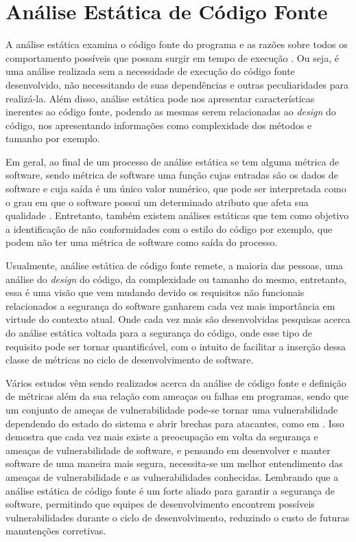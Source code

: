 \chapter{Análise Estática de Código Fonte} \label{chap:analiseestatica}

A análise estática examina o código fonte do programa e as razões sobre todos os
comportamento possíveis que possam surgir em tempo de execução
\cite{ernst:2005}. Ou seja, é uma análise realizada sem a necessidade de
execução do código fonte desenvolvido, não necessitando de suas dependências e
outras peculiaridades para realizá-la. Além disso, análise estática pode nos apresentar
características inerentes ao código fonte, podendo as mesmas serem relacionadas
ao \textit{design} do código, nos apresentando informações como complexidade dos
métodos e tamanho por exemplo.

Em geral, ao final de um processo de análise estática se tem alguma métrica de
software, sendo métrica de software uma função cujas entradas são os dados de
software e cuja saída é um único valor numérico, que pode ser interpretada como
o grau em que o software possui um determinado atributo que afeta sua qualidade
\cite{ieee:1061}. Entretanto, também existem análises estáticas que tem como
objetivo a identificação de não conformidades com o estilo do código por exemplo,
que podem não ter uma métrica de software como saída do processo.

Usualmente, análise estática de código fonte remete, a maioria das pessoas, uma
análise do \textit{design} do código, da complexidade ou tamanho do mesmo,
entretanto, essa é uma visão que vem mudando devido os requisitos não funcionais
relacionados a segurança do software ganharem cada vez mais importância em
virtude do contexto atual. Onde cada vez mais são desenvolvidas pesquisas acerca
do análise estática voltada para a segurança do código, onde esse tipo de
requisito pode ser tornar quantificável, com o intuito de facilitar a inserção
dessa classe de métricas no ciclo de desenvolvimento de software.

Vários estudos vêm sendo realizados acerca da análise de código fonte e
definição de métricas além da sua relação com ameaças ou falhas em programas,
sendo que um conjunto de ameças de vulnerabilidade pode-se tornar uma
vulnerabilidade dependendo do estado do sistema e abrir brechas para atacantes,
como em .
Isso demostra que cada vez mais existe a preocupação em volta da segurança e
ameaças de vulnerabilidade de software, e pensando em desenvolver e manter
software de uma maneira mais segura, necessita-se um melhor entendimento das
ameaças de vulnerabilidade e as vulnerabilidades conhecidas. Lembrando que a
análise estática de código fonte é um forte aliado para garantir a segurança de
software, permitindo que equipes de desenvolvimento encontrem possíveis
vulnerabilidades durante o ciclo de desenvolvimento, reduzindo o custo de
futuras manutenções corretivas.

